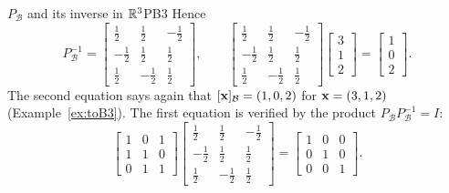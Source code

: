 \documentclass[11pt]{article}
\begin{document}
\begin{exmp}{$P_{\mathcal{B}}$ and its inverse in $\mathbb{R}^3$}{PB3}
Hence
\[
P_{\mathcal{B}}^{-1}=\begin{bmatrix}\tfrac12&\tfrac12&-\tfrac12\\-\tfrac12&\tfrac12&\tfrac12\\\tfrac12&-\tfrac12&\tfrac12\end{bmatrix},\qquad
\begin{bmatrix}\tfrac12&\tfrac12&-\tfrac12\\-\tfrac12&\tfrac12&\tfrac12\\\tfrac12&-\tfrac12&\tfrac12\end{bmatrix}\begin{bmatrix}3\\1\\2\end{bmatrix}=\begin{bmatrix}1\\0\\2\end{bmatrix}.
\]
The second equation says again that $[\mathbf{x}]_{\mathcal{B}}=(1,0,2)$ for $\mathbf{x}=(3,1,2)$ (Example~\ref{ex:toB3}). The first equation is verified by the product $P_{\mathcal{B}}P_{\mathcal{B}}^{-1}=I$:
\[
\begin{bmatrix}1&0&1\\1&1&0\\0&1&1\end{bmatrix}\begin{bmatrix}\tfrac12&\tfrac12&-\tfrac12\\-\tfrac12&\tfrac12&\tfrac12\\\tfrac12&-\tfrac12&\tfrac12\end{bmatrix}=\begin{bmatrix}1&0&0\\0&1&0\\0&0&1\end{bmatrix}.
\]
\end{exmp}
\end{document}
